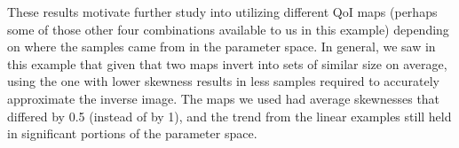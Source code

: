 These results motivate further study into utilizing different QoI maps (perhaps some of those other four combinations available to us in this example) depending on where the samples came from in the parameter space.
In general, we saw in this example that given that two maps invert into sets of similar size on average, using the one with lower skewness results in less samples required to accurately approximate the inverse image.
The maps we used had average skewnesses that differed by 0.5 (instead of by 1), and the trend from the linear examples still held in significant portions of the parameter space.
